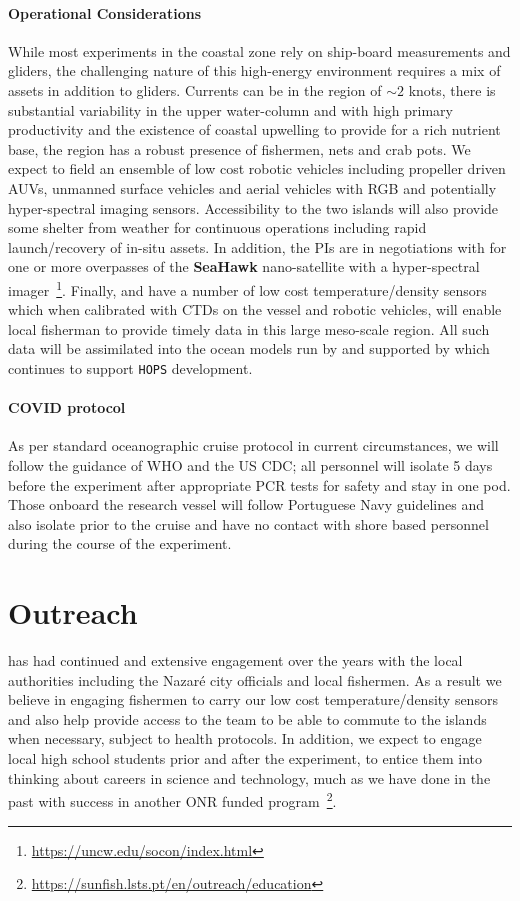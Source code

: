 \paragraph{Operational Considerations} While most experiments in the
coastal zone rely on ship-board measurements and gliders, the
challenging nature of this high-energy environment requires a mix of
assets in addition to gliders. Currents can be in the region of
$\sim 2$ knots, there is substantial variability in the upper
water-column and with high primary productivity and the existence of
coastal upwelling to provide for a rich nutrient base, the region has
a robust presence of fishermen, nets and crab pots. We expect to field
an ensemble of low cost robotic vehicles including propeller driven
AUVs, unmanned surface vehicles and aerial vehicles with RGB and
potentially hyper-spectral imaging sensors. Accessibility to the two
islands will also provide some shelter from weather for continuous
operations including rapid launch/recovery of in-situ assets. In
addition, the PIs are in negotiations with \nas for one or more
overpasses of the \textbf{SeaHawk} nano-satellite with a
hyper-spectral
imager~\footnote{\url{https://uncw.edu/socon/index.html}}. Finally,
\univ and \inst have a number of low cost temperature/density sensors
which when calibrated with CTDs on the vessel and robotic vehicles,
will enable local fisherman to provide timely data in this large
meso-scale region. All such data will be assimilated into the ocean
models run by \inst and supported by  which continues to support
\texttt{HOPS} development.

\paragraph{COVID protocol} As per standard oceanographic cruise
protocol in current circumstances, we will follow the guidance of WHO
and the US CDC; all personnel will isolate 5 days before the
experiment after appropriate PCR tests for safety and stay in one
pod. Those onboard the \inst research vessel will follow Portuguese
Navy guidelines and also isolate prior to the cruise and have no
contact with shore based personnel during the course of the
experiment.

\section*{Outreach}

\inst has had continued and extensive engagement over the years with
the local authorities including the Nazar\'e city officials and local
fishermen. As a result we believe in engaging fishermen to carry our
low cost temperature/density sensors and also help provide access to
the team to be able to commute to the islands when necessary, subject
to health protocols. In addition, we expect to engage local high
school students prior and after the experiment, to entice them into
thinking about careers in science and technology, much as we have done
in the past with success in another ONR funded
program~\footnote{\url{https://sunfish.lsts.pt/en/outreach/education}}.

